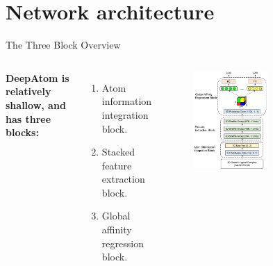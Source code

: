 \documentclass[aspectratio=169,xcolor=dvipsnames]{beamer}
\begin{document}
\section{Network architecture}
\begin{frame}{The Three Block Overview}
    \begin{columns}[c]
        \textbf{DeepAtom is relatively shallow, and has three blocks:}
        \begin{enumerate}
            \item Atom information integration block.
            \item Stacked feature extraction block.
            \item Global affinity regression block.
        \end{enumerate}
        \begin{figure}
            \includegraphics[width=0.55\textwidth]{images/network_left}
        \end{figure}
    \end{columns}
\end{frame}
\end{document}
